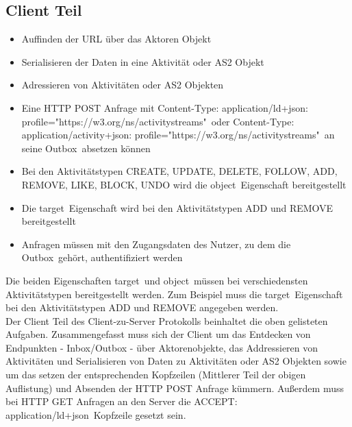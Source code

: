 	\subsection{Client Teil}
	\label{client-to-server:client-part}
		\begin{itemize}
			\item Auffinden der URL über das Aktoren Objekt
			\item Serialisieren der Daten in eine Aktivität oder \gls{AS2} Objekt
			\item Adressieren von Aktivitäten oder \gls{AS2} Objekten
			\item Eine HTTP POST Anfrage mit \glqq Content-Type: application/ld+json: profile="https://w3.org/ns/activitystreams"\grqq~oder \glqq Content-Type: application/activity+json: profile="https://w3.org/ns/activitystreams"\grqq~an seine \glqq Outbox\grqq~absetzen können
			\item Bei den Aktivitätstypen CREATE, UPDATE, DELETE, FOLLOW, ADD, REMOVE, LIKE, BLOCK, UNDO wird die \glqq object\grqq~Eigenschaft bereitgestellt
			\item Die \glqq target\grqq~Eigenschaft wird bei den Aktivitätstypen ADD und REMOVE bereitgestellt
			\item Anfragen müssen mit den Zugangsdaten des Nutzer, zu dem die \glqq Outbox\grqq~gehört, authentifiziert werden
		\end{itemize}
		Die beiden Eigenschaften \glqq target\grqq~und \glqq object\grqq~müssen bei verschiedensten Aktivitätstypen bereitgestellt werden. Zum Beispiel muss die \glqq target\grqq~Eigenschaft bei den Aktivitätstypen ADD und REMOVE angegeben werden.\\
		
		Der Client Teil des Client-zu-Server Protokolls beinhaltet die oben gelisteten Aufgaben. Zusammengefasst muss sich der Client um das Entdecken von Endpunkten - Inbox/Outbox - über Aktorenobjekte, das Addressieren von Aktivitäten und Serialisieren von Daten zu Aktivitäten oder \gls{AS2} Objekten sowie um das setzen der entsprechenden Kopfzeilen (Mittlerer Teil der obigen Auflistung) und Absenden der HTTP POST Anfrage kümmern. Außerdem muss bei HTTP GET Anfragen an den Server die \glqq ACCEPT: application/ld+json\grqq~Kopfzeile gesetzt sein.\\
		
